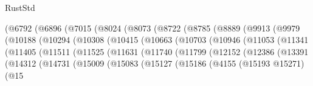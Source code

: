 \begin{lexlean}{RustStd}
\begin{coremodule}
{\begin{coremodule}
{{{{{{{{{{{{{{{{{{{{{{{{{{{{{{{{{{{{{{{{{{{{{{{{{{{{{{{{{{{{                        (@6792
                          (@6896
                            (@7015
                              (@8024
                                (@8073
                                  (@8722
                                    (@8785
                                      (@8889
                                        (@9913
                                          (@9979
                                            (@10188
                                              (@10294
                                                (@10308
                                                  (@10415
                                                    (@10663
                                                      (@10703
                                                        (@10946
                                                          (@11053
                                                            (@11341
                                                              (@11405
                                                                (@11511
                                                                  (@11525
                                                                    (@11631
                                                                      (@11740
                                                                        (@11799
                                                                          (@12152
                                                                            (@12386
                                                                              (@13391
                                                                                (@14312
                                                                                  (@14731
                                                                                    (@15009
                                                                                      (@15083
                                                                                        (@15127
                                                                                          (@15186
                                                                                            (@4155
                                                                                              (@15193
                                                                                                @15271)
                                                                                              (@15
}}}}}}}}}}}}}}}}}}}}}}}}}}}}}}}}}}}}}}}}}}}}}}}}}}}}}}}}}}}}
\end{coremodule}}
\end{coremodule}
\end{lexlean}
